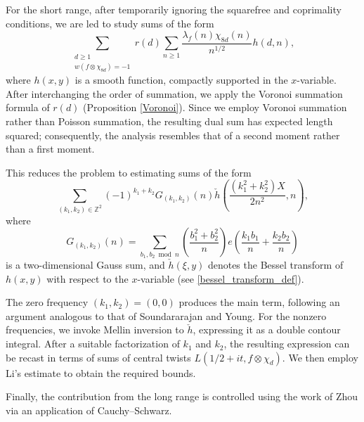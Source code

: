 \documentclass[12pt]{amsart}
\begin{document}
For the short range, after temporarily ignoring the squarefree and coprimality conditions, we are led to study sums of the form
$$
\sum_{\substack{d\ge1\\ w(f\otimes\chi_{8d})=-1}}
r(d)
\sum_{n\ge1}
\frac{\lambda_f(n)\chi_{8d}(n)}{n^{1/2}}
h(d,n),
$$
where $h(x,y)$ is a smooth function, compactly supported in the $x$-variable. After interchanging the order of summation, we apply the Voronoi summation formula of $r(d)$ (Proposition \ref{Voronoi}). Since we employ Voronoi summation rather than Poisson summation, the resulting dual sum has expected length squared; consequently, the analysis resembles that of a second moment rather than a first moment.

This reduces the problem to estimating sums of the form
$$
\sum_{(k_1,k_2)\in\mathbb Z^2}
(-1)^{k_1+k_2}
G_{(k_1,k_2)}(n)
\check{h}\left(
\frac{(k_1^2+k_2^2)X}{2n^2},
n
\right),
$$
where
$$
G_{(k_1,k_2)}(n)
=
\sum_{b_1,b_2\bmod n}
\left(\frac{b_1^2+b_2^2}{n}\right)
e\left(
\frac{k_1b_1}{n}
+
\frac{k_2b_2}{n}
\right)
$$
is a two-dimensional Gauss sum, and $\check{h}(\xi,y)$ denotes the Bessel transform of $h(x,y)$ with respect to the $x$-variable (see \eqref{bessel_transform_def}).

The zero frequency $(k_1,k_2)=(0,0)$ produces the main term, following an argument analogous to that of Soundararajan and Young. For the nonzero frequencies, we invoke Mellin inversion to $\check{h}$, expressing it as a double contour integral. After a suitable factorization of $k_1$ and $k_2$, the resulting expression can be recast in terms of sums of central twists $L(1/2+it,f\otimes\chi_d)$. We then employ Li's estimate \cite{XLi} to obtain the required bounds.

Finally, the contribution from the long range is controlled using the work of Zhou \cite[Proposition~4.3]{zhou} via an application of Cauchy--Schwarz.
\end{document}
